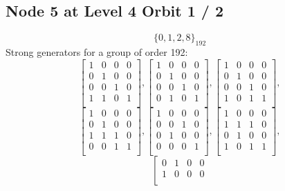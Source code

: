 \subsection*{Node 5 at Level 4 Orbit 1 / 2}
$$
\{ 0, 1, 2, 8 \}_{192}$$
{\small\arraycolsep=2pt
Strong generators for a group of order 192:
$$
\left[
\begin{array}{*{4}{r}}
1 & 0 & 0 & 0\\
0 & 1 & 0 & 0\\
0 & 0 & 1 & 0\\
1 & 1 & 0 & 1\\
\end{array}
\right]
, 
\left[
\begin{array}{*{4}{r}}
1 & 0 & 0 & 0\\
0 & 1 & 0 & 0\\
0 & 0 & 1 & 0\\
0 & 1 & 0 & 1\\
\end{array}
\right]
, 
\left[
\begin{array}{*{4}{r}}
1 & 0 & 0 & 0\\
0 & 1 & 0 & 0\\
0 & 0 & 1 & 0\\
1 & 0 & 1 & 1\\
\end{array}
\right]
, 
$$
$$
\left[
\begin{array}{*{4}{r}}
1 & 0 & 0 & 0\\
0 & 1 & 0 & 0\\
1 & 1 & 1 & 0\\
0 & 0 & 1 & 1\\
\end{array}
\right]
, 
\left[
\begin{array}{*{4}{r}}
1 & 0 & 0 & 0\\
0 & 0 & 1 & 0\\
0 & 1 & 0 & 0\\
0 & 0 & 0 & 1\\
\end{array}
\right]
, 
\left[
\begin{array}{*{4}{r}}
1 & 0 & 0 & 0\\
1 & 1 & 1 & 0\\
0 & 1 & 0 & 0\\
1 & 0 & 1 & 1\\
\end{array}
\right]
, 
$$
$$
\left[
\begin{array}{*{4}{r}}
0 & 1 & 0 & 0\\
1 & 0 & 0 & 0\\

\end{array}$$}
